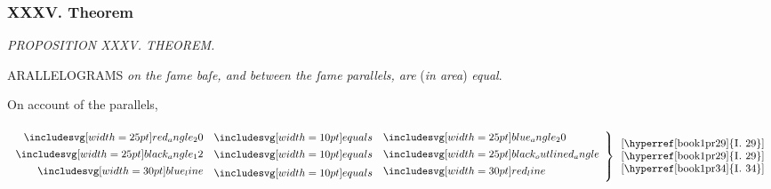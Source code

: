 \documentclass[11pt,preview]{standalone}
\begin{document}
\subsubsection{XXXV. Theorem}

\begin{minipage}[t]{0.43\textwidth}
    \vspace{16pt}
    
\end{minipage}%
\hfill
\begin{minipage}[t]{0.54\textwidth}
    \begin{center}
        \textit{PROPOSITION XXXV. THEOREM.}\label{book1pr35} \\
    \end{center}

    \hfill

    \begin{center}
        \raggedright \lettrine[lines=3, loversize=1, nindent=0pt]{}{}ARALLELOGRAMS \textit{on the ſame baſe, and between the ſame parallels, are} (\textit{in area}) \textit{equal}.
    \end{center}
\end{minipage}

\hfill

\hfill

\begin{center}
    On account of the parallels,\\
    \hfill\\
    $\left.\begin{aligned}\img{red_angle_20} & \bequals \img{blue_angle_20} \\ \img{black_angle_12} & \bequals \img{black_outlined_angle} \\ \blueline & \bequals \redline \end{aligned}\right\}\begin{array}{l}\text{[\hyperref[book1pr29]{\textsc{I.} 29}]} \\ \text{[\hyperref[book1pr29]{\textsc{I.} 29}]} \\ \text{[\hyperref[book1pr34]{\textsc{I.} 34}]} \end{array}$
\end{center}

\hfill

\hfill
\end{document}
